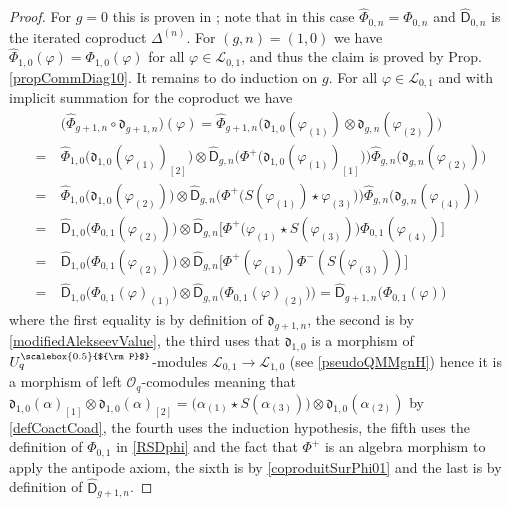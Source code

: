 \documentclass[11pt]{amsart}
\newcommand{\Ll}{\mathcal{L}}
\newcommand{\Pup}{{\scalebox{0.5}{${\rm P}$}}}
\begin{document}
\begin{proof}
For $g=0$ this is proven in \cite[Prop.\,6.18]{BR1}; note that in this case $\widehat{\Phi}_{0,n} = \Phi_{0,n}$ and $\widehat{\mathsf{D}}_{0,n}$ is the iterated coproduct $\Delta^{(n)}$. For $(g,n) = (1,0)$ we have $\widehat{\Phi}_{1,0}(\varphi) = \Phi_{1,0}(\varphi)$ for all $\varphi\in \Ll_{0,1}$, and thus the claim is proved by Prop.\,\ref{propCommDiag10}. It remains to do induction on $g$. For all $\varphi \in \mathcal{L}_{0,1}$ and with implicit summation for the coproduct we have
\begin{align*}
& \bigl(\widehat{\Phi}_{g+1,n} \circ \mathfrak{d}_{g+1,n})(\varphi) = \widehat{\Phi}_{g+1,n}\bigl( \mathfrak{d}_{1,0}(\varphi_{(1)}) \otimes \mathfrak{d}_{g,n}(\varphi_{(2)}) \bigr)\\
=\:&\widehat{\Phi}_{1,0}\bigl( \mathfrak{d}_{1,0}(\varphi_{(1)})_{[2]} \bigr) \otimes \widehat{\mathsf{D}}_{g,n}\bigl( \Phi^+\bigl(\mathfrak{d}_{1,0}(\varphi_{(1)})_{[1]} \bigr) \bigr) \widehat{\Phi}_{g,n}\bigl( \mathfrak{d}_{g,n}(\varphi_{(2)}) \bigr)\\
=\:& \widehat{\Phi}_{1,0}\bigl( \mathfrak{d}_{1,0}(\varphi_{(2)}) \bigr) \otimes \widehat{\mathsf{D}}_{g,n}\bigl( \Phi^+\bigl(S(\varphi_{(1)})\star \varphi_{(3)} \bigr) \bigr) \widehat{\Phi}_{g,n}\bigl( \mathfrak{d}_{g,n}(\varphi_{(4)}) \bigr)\\
=\:& \widehat{\mathsf{D}}_{1,0}\bigl( \Phi_{0,1}(\varphi_{(2)}) \bigr) \otimes \widehat{\mathsf{D}}_{g,n}\bigl[ \Phi^+\bigl(\varphi_{(1)}\star S(\varphi_{(3)}) \bigr)  \Phi_{0,1}(\varphi_{(4)}) \bigr]\\
=\:& \widehat{\mathsf{D}}_{1,0}\bigl( \Phi_{0,1}(\varphi_{(2)}) \bigr) \otimes \widehat{\mathsf{D}}_{g,n}\bigl[ \Phi^+(\varphi_{(1)})  \Phi^-(S(\varphi_{(3)})) \bigr]\\
=\:& \widehat{\mathsf{D}}_{1,0}\bigl( \Phi_{0,1}(\varphi)_{(1)} \bigr) \otimes \widehat{\mathsf{D}}_{g,n}\bigl( \Phi_{0,1}(\varphi)_{(2)}) \bigr) = \widehat{\mathsf{D}}_{g+1,n}\bigl( \Phi_{0,1}(\varphi) \bigr)
\end{align*}
where the first equality is by definition of $\mathfrak{d}_{g+1,n}$, the second is by \eqref{modifiedAlekseevValue}, the third uses that $\mathfrak{d}_{1,0}$ is a morphism of $U_q^\Pup$-modules $\mathcal{L}_{0,1} \to \mathcal{L}_{1,0}$ (see \eqref{pseudoQMMgnH}) hence it is a morphism of left $\mathcal{O}_q$-comodules meaning that $\mathfrak{d}_{1,0}(\alpha)_{[1]} \otimes \mathfrak{d}_{1,0}(\alpha)_{[2]} = \bigl( \alpha_{(1)} \star S(\alpha_{(3)}) \bigr) \otimes \mathfrak{d}_{1,0}(\alpha_{(2)})$ by \eqref{defCoactCoad}, the fourth uses the induction hypothesis, the fifth uses the definition of $\Phi_{0,1}$ in \eqref{RSDphi} and the fact that $\Phi^+$ is an algebra morphism to apply the antipode axiom, the sixth is by \eqref{coproduitSurPhi01} and the last is by definition of $\widehat{\mathsf{D}}_{g+1,n}$.
\end{proof}
\end{document}
